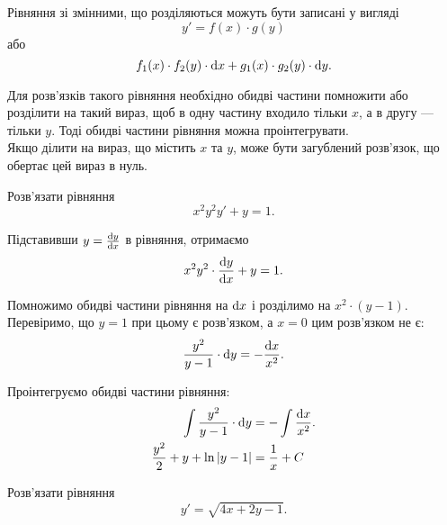 Рівняння зі змінними, що розділяються можуть бути записані у вигляді \[y' = f(x) \cdot g(y)\] або \[f_1(x) \cdot f_2(y) \cdot \mathop{}\!\mathrm{d} x + g_1(x) \cdot g_2(y) \cdot \mathop{}\!\mathrm{d} y.\] 

Для розв'язків такого рівняння необхідно обидві частини помножити або розділити на такий вираз, щоб в одну частину входило тільки $x$, а в другу --- тільки $y$. Тоді обидві частини рівняння можна проінтегрувати. \\

Якщо ділити на вираз, що містить $x$ та $y$, може бути загублений роз\-в'яз\-ок, що обертає цей вираз в нуль.

\begin{example}
	Розв'язати рівняння \[x^2 y^2 y' + y = 1.\]
\end{example}

\begin{solution}
	Підставивши $y = \frac{\mathop{}\!\mathrm{d} y}{\mathop{}\!\mathrm{d} x}$ в рівняння, отримаємо \[ x^2 y^2 \cdot \frac{\mathop{}\!\mathrm{d} y}{\mathop{}\!\mathrm{d} x} + y = 1.\] 

	Помножимо обидві частини рівняння на $\mathop{}\!\mathrm{d} x$ і розділимо на $x^2 \cdot (y - 1)$. Перевіримо, що $y = 1$ при цьому є роз\-в'яз\-ком, а $x = 0$ цим роз\-в'яз\-ком не є: \[ \frac{y^2}{y - 1} \cdot \mathop{}\!\mathrm{d} y = - \frac{\mathop{}\!\mathrm{d} x}{x^2}. \] 

	Проінтегруємо обидві частини рівняння:
	\begin{align*}
		\int \frac{y^2}{y - 1} \cdot \mathop{}\!\mathrm{d} y &= - \int \frac{\mathop{}\!\mathrm{d} x}{x^2}. \\
		\frac{y^2}{2} + y + \ln |y - 1| &= \frac{1}{x} + C
	\end{align*}
\end{solution}

\begin{example}
	Розв'язати рівняння \[ y' = \sqrt{4x + 2y - 1}.\] 
\end{example}

